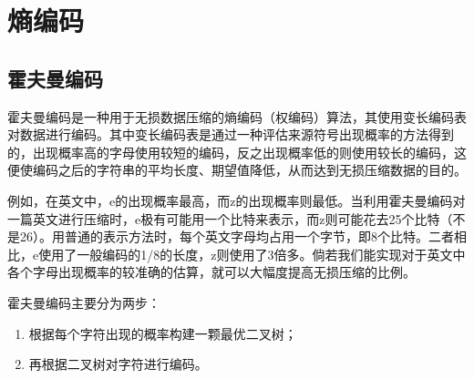 \section{熵编码}
\subsection{霍夫曼编码}
霍夫曼编码是一种用于无损数据压缩的熵编码（权编码）算法，其使用变长编码表对数据进行编码。其中变长编码表是通过一种评估来源符号出现概率的方法得到的，出现概率高的字母使用较短的编码，反之出现概率低的则使用较长的编码，这便使编码之后的字符串的平均长度、期望值降低，从而达到无损压缩数据的目的。

例如，在英文中，e的出现概率最高，而z的出现概率则最低。当利用霍夫曼编码对一篇英文进行压缩时，e极有可能用一个比特来表示，而z则可能花去25个比特（不是26）。用普通的表示方法时，每个英文字母均占用一个字节，即8个比特。二者相比，e使用了一般编码的1/8的长度，z则使用了3倍多。倘若我们能实现对于英文中各个字母出现概率的较准确的估算，就可以大幅度提高无损压缩的比例。

霍夫曼编码主要分为两步：
\begin{enumerate}
    \item 根据每个字符出现的概率构建一颗最优二叉树；
    \item 再根据二叉树对字符进行编码。
\end{enumerate}


